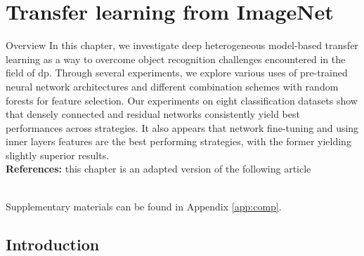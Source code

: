 \chapter{Transfer learning from ImageNet}
\label{chap:comp}



\begin{overview}{Overview}
    In this chapter, we investigate deep heterogeneous model-based transfer learning as a way to overcome object recognition challenges encountered in the field of \acrlong{dp}. Through several experiments, we explore various uses of pre-trained neural network architectures and different combination schemes with random forests for feature selection. Our experiments on eight classification datasets show that densely connected and residual networks consistently yield best performances across strategies. It also appears that network fine-tuning and using inner layers features are the best performing strategies, with the former yielding slightly superior results. \\

    \textbf{References:} this chapter is an adapted version of the following article 

     \\

    Supplementary materials can be found in Appendix \ref{app:comp}.
\end{overview}

\section{Introduction}


